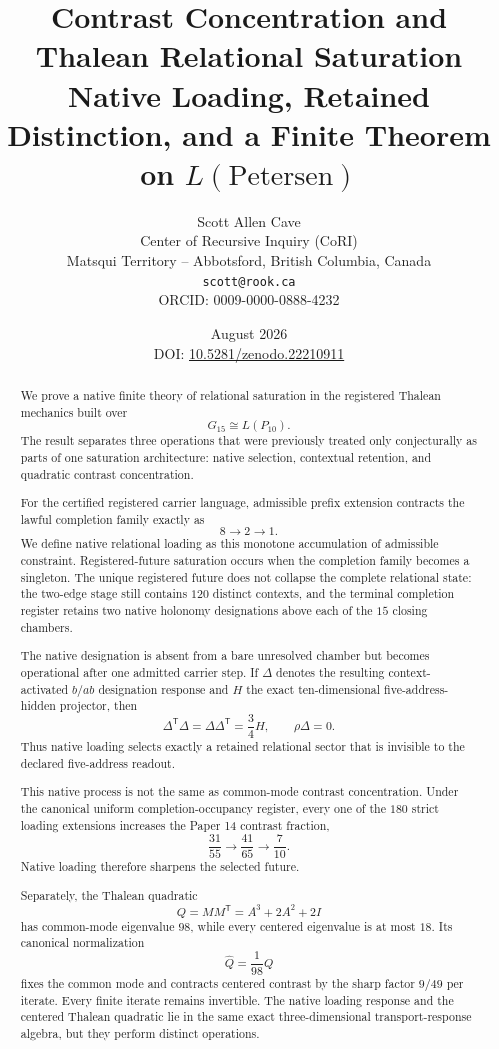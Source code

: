 \documentclass[11pt]{article}
\title{
Contrast Concentration and\\
Thalean Relational Saturation\\[0.4em]
\large Native Loading, Retained Distinction, and a Finite Theorem on
$L(\mathrm{Petersen})$
}
\author{
Scott Allen Cave\\
Center of Recursive Inquiry (CoRI)\\
Matsqui Territory -- Abbotsford, British Columbia, Canada\\
\texttt{scott@rook.ca}\\
ORCID: 0009-0000-0888-4232
}
\date{August 2026\\[0.3em]
\small DOI: \href{https://doi.org/10.5281/zenodo.22210911}{10.5281/zenodo.22210911}}
\newcommand{\Gfifteen}{G_{15}}
\newcommand{\Petersen}{P_{10}}
\begin{document}
\maketitle

\begin{abstract}
We prove a native finite theory of relational saturation in the
registered Thalean mechanics built over
\[
\Gfifteen\cong L(\Petersen).
\]
The result separates three operations that were previously treated
only conjecturally as parts of one saturation architecture:
native selection, contextual retention, and quadratic contrast
concentration.

For the certified registered carrier language, admissible prefix
extension contracts the lawful completion family exactly as
\[
8\longrightarrow2\longrightarrow1.
\]
We define native relational loading as this monotone accumulation of
admissible constraint.  Registered-future saturation occurs when the
completion family becomes a singleton.  The unique registered future
does not collapse the complete relational state: the two-edge stage
still contains \(120\) distinct contexts, and the terminal completion
register retains two native holonomy designations above each of the
\(15\) closing chambers.

The native designation is absent from a bare unresolved chamber but
becomes operational after one admitted carrier step.  If
\(\Delta\) denotes the resulting context-activated \(b/ab\)
designation response and \(H\) the exact ten-dimensional
five-address-hidden projector, then
\[
\Delta^{\mathsf T}\Delta
=
\Delta\Delta^{\mathsf T}
=
\frac34 H,
\qquad
\rho\Delta=0.
\]
Thus native loading selects exactly a retained relational sector that
is invisible to the declared five-address readout.

This native process is not the same as common-mode contrast
concentration.  Under the canonical uniform completion-occupancy
register, every one of the \(180\) strict loading extensions increases
the Paper 14 contrast fraction,
\[
\frac{31}{55}
\longrightarrow
\frac{41}{65}
\longrightarrow
\frac{7}{10}.
\]
Native loading therefore sharpens the selected future.

Separately, the Thalean quadratic
\[
Q=MM^{\mathsf T}=A^3+2A^2+2I
\]
has common-mode eigenvalue \(98\), while every centered eigenvalue is
at most \(18\).  Its canonical normalization
\[
\widehat Q=\frac1{98}Q
\]
fixes the common mode and contracts centered contrast by the sharp
factor \(9/49\) per iterate.  Every finite iterate remains invertible.
The native loading response and the centered Thalean quadratic lie in
the same exact three-dimensional transport-response algebra, but they
perform distinct operations.


\end{abstract}
\end{document}
